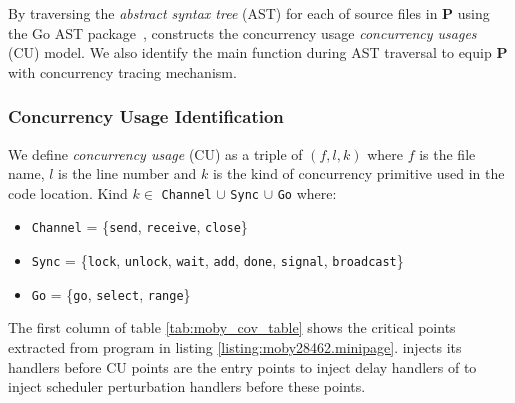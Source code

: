 By traversing the \textit{abstract syntax tree} (AST) for each of source files in \textbf{P} using the Go AST package~\cite{go-package-ast}, \goat constructs the concurrency usage \textit{concurrency usages} (CU) model.
%
We also identify the main function during AST traversal to equip \textbf{P} with concurrency tracing mechanism.

\subsubsection{Concurrency Usage Identification}

We define \textit{concurrency usage} (CU) as a triple of $(f,l,k)$ where $f$ is the file name, $l$ is the line number and $k$ is the kind of concurrency primitive used in the code location.
Kind $k\in$ \texttt{Channel} $\cup$ \texttt{Sync} $\cup$ \texttt{Go} where:
\begin{itemize}
  \item \texttt{Channel} = \{\texttt{send}, \texttt{receive}, \texttt{close}\}
  \item \texttt{Sync} = \{\texttt{lock}, \texttt{unlock}, \texttt{wait}, \texttt{add}, \texttt{done}, \texttt{signal}, \texttt{broadcast}\}
  \item \texttt{Go} = \{\texttt{go}, \texttt{select}, \texttt{range}\}
\end{itemize}

The first column of table \ref{tab:moby_cov_table} shows the critical points extracted from program in listing \ref{listing:moby28462.minipage}.
%
\goat injects its handlers before CU points are the entry points to inject delay handlers of \goat to inject scheduler perturbation handlers before these points.

%

